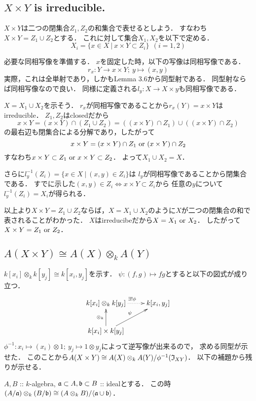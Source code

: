 \documentclass[a4paper]{jsarticle}
\begin{document}
    \subsection{$X \times Y$ is irreducible.}
    $X \times Y$は二つの閉集合$Z_1, Z_2$の和集合で表せるとしよう．
    すなわち$X \times Y=Z_1 \cup Z_2$とする．
    これに対して集合$X_1, X_2$を以下で定める．
    \[ X_i=\{ x \in X ~|~ x \times Y \subset Z_i \} ~~(i=1,2) \]

    必要な同相写像を準備する．
    $x$を固定した時，以下の写像は同相写像である．
    \[ r_x: Y \to x \times Y;~ y \mapsto (x,y) \]
    実際，これは全単射であり，しかもLemma 3.6から同型射である．
    同型射ならば同相写像なので良い．
    同様に定義される$l_y:X \to X \times y$も同相写像である．

    $X=X_1 \cup X_2$を示そう．
    $r_x$が同相写像であることから$r_x(Y)=x \times Y$はirreducible．
    $Z_1, Z_2$はclosedだから
    \[ x \times Y=(x \times Y) \cap (Z_1 \cup Z_2)=((x \times Y) \cap Z_1) \cup ((x \times Y) \cap Z_2) \]
    の最右辺も閉集合による分解であり，したがって
    \[ x \times Y=(x \times Y) \cap Z_1 \text{ or } (x \times Y) \cap Z_2  \]
    すなわち$x \times Y \subset Z_1 \text{ or } x \times Y \subset Z_2$．
    よって$X_1 \cup X_2=X$．

    さらに$l_y^{-1}(Z_i)=\{ x \in X ~|~ (x,y) \in Z_i\}$は
    $l_y$が同相写像であることから閉集合である．
    すでに示した$(x,y) \in Z_i \iff x \times Y \subset Z_i$から
    任意の$y$について$l_y^{-1}(Z_i)=X_i$が得られる．
    
    以上より$X \times Y=Z_1 \cup Z_2$ならば，$X=X_1 \cup X_2$のように$X$が二つの閉集合の和で表されることがわかった．
    $X$はirreducibeだから$X=X_1 \text{ or } X_2$．
    したがって$X \times Y=Z_1 \text{ or } Z_2$．

    \subsection{$A(X \times Y) \cong A(X) \otimes_k A(Y)$}
    $k[x_i] \otimes_k k[y_j] \cong k[x_i,y_j]$を示す．
    $\psi: (f,g) \mapsto fg$とすると以下の図式が成り立つ．
    \[
        \xymatrix
        {
        k[x_i] \otimes_k k[y_j] \ar@{..>}[r]^{\exists ! \phi} & k[x_i,y_j]\\
        k[x_i] \times k[y_j] \ar[u]^{\otimes_k} \ar[ur]^{\psi}
        }
    \]
    $\phi^{-1}: x_i \mapsto (x_i) \otimes 1;~ y_j \mapsto 1 \otimes y_j$によって逆写像が出来るので，
    求める同型が示せた．
    このことから$A(X \times Y) \cong A(X) \otimes_k A(Y)/\phi^{-1}(\mathfrak{I}_{XY})$．
    以下の補題から残りが示せる．
    \begin{Lemma}
        $A,B$ :: $k$-algebra, $\mathfrak{a} \subset A, \mathfrak{b} \subset B$ :: idealとする．
        この時$(A/\mathfrak{a}) \otimes_k (B/\mathfrak{b}) \cong (A \otimes_k B)/\langle \mathfrak{a} \cup \mathfrak{b} \rangle$．
    \end{Lemma}
\end{document}
